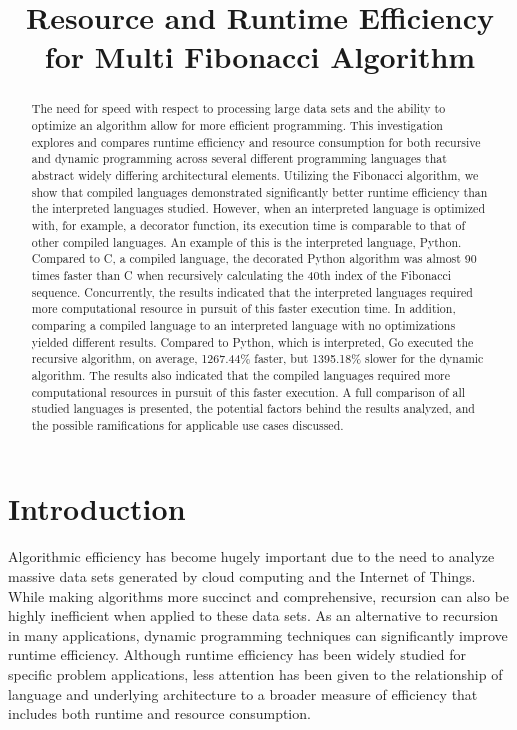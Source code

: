 \documentclass{sig-alternate}
\title{Resource and Runtime Efficiency for Multi Fibonacci Algorithm}
\author{}
\begin{document}
\maketitle
\thispagestyle{firstpage}
\pagestyle{plain}




\begin{abstract}

The need for speed with respect to processing large data sets and the ability to optimize an algorithm allow for more efficient programming. This investigation explores and compares runtime efficiency and resource consumption for both recursive and dynamic programming across several different programming languages that abstract widely differing architectural elements. Utilizing the Fibonacci algorithm, we show that compiled languages demonstrated significantly better runtime efficiency than the interpreted languages studied. However, when an interpreted language is optimized with, for example, a decorator function, its execution time is comparable to that of other compiled languages. An example of this is the interpreted language, Python. Compared to C, a compiled language, the decorated Python algorithm was almost 90 times faster than C when recursively calculating the 40th index of the Fibonacci sequence. Concurrently, the results indicated that the interpreted languages required more computational resource in pursuit of this faster execution time. In addition, comparing a compiled language to an interpreted language with no optimizations yielded different results. Compared to Python, which is interpreted, Go executed the recursive algorithm, on average, 1267.44\% faster, but 1395.18\% slower for the dynamic algorithm. The results also indicated that the compiled languages required more computational resources in pursuit of this faster execution. A full comparison of all studied languages is presented, the potential factors behind the results analyzed, and the possible ramifications for applicable use cases discussed.

\end{abstract}

\section{Introduction}
Algorithmic efficiency has become hugely important due to the need to analyze massive data sets generated by cloud computing and the Internet of Things. While making algorithms more succinct and comprehensive, recursion can also be highly inefficient when applied to these data sets. As an alternative to recursion in many applications, dynamic programming techniques can significantly improve runtime efficiency. Although runtime efficiency has been widely studied for specific problem applications, less attention has been given to the relationship of language and underlying architecture to a broader measure of efficiency that includes both runtime and resource consumption.
\end{document}
